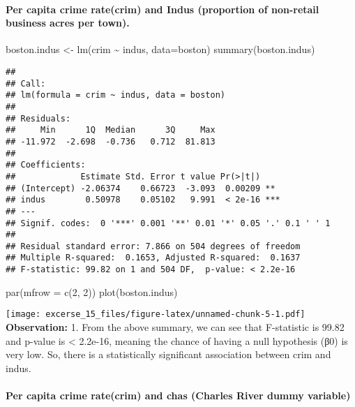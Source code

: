 \documentclass[
]{article}
\newenvironment{Shaded}{\begin{snugshade}}{\end{snugshade}}
\newcommand{\AttributeTok}[1]{\textcolor[rgb]{0.77,0.63,0.00}{#1}}
\newcommand{\DecValTok}[1]{\textcolor[rgb]{0.00,0.00,0.81}{#1}}
\newcommand{\FunctionTok}[1]{\textcolor[rgb]{0.00,0.00,0.00}{#1}}
\newcommand{\NormalTok}[1]{#1}
\newcommand{\OtherTok}[1]{\textcolor[rgb]{0.56,0.35,0.01}{#1}}
\newcommand{\SpecialCharTok}[1]{\textcolor[rgb]{0.00,0.00,0.00}{#1}}
\begin{document}
\hypertarget{per-capita-crime-ratecrim-and-indus-proportion-of-non-retail-business-acres-per-town.}{%
\paragraph{Per capita crime rate(crim) and Indus (proportion of
non-retail business acres per
town).}\label{per-capita-crime-ratecrim-and-indus-proportion-of-non-retail-business-acres-per-town.}}

\begin{Shaded}
\begin{Highlighting}[]
\NormalTok{boston.indus }\OtherTok{\textless{}{-}} \FunctionTok{lm}\NormalTok{(crim }\SpecialCharTok{\textasciitilde{}}\NormalTok{ indus, }\AttributeTok{data=}\NormalTok{boston)}
\FunctionTok{summary}\NormalTok{(boston.indus)}
\end{Highlighting}
\end{Shaded}

\begin{verbatim}
## 
## Call:
## lm(formula = crim ~ indus, data = boston)
## 
## Residuals:
##     Min      1Q  Median      3Q     Max 
## -11.972  -2.698  -0.736   0.712  81.813 
## 
## Coefficients:
##             Estimate Std. Error t value Pr(>|t|)    
## (Intercept) -2.06374    0.66723  -3.093  0.00209 ** 
## indus        0.50978    0.05102   9.991  < 2e-16 ***
## ---
## Signif. codes:  0 '***' 0.001 '**' 0.01 '*' 0.05 '.' 0.1 ' ' 1
## 
## Residual standard error: 7.866 on 504 degrees of freedom
## Multiple R-squared:  0.1653, Adjusted R-squared:  0.1637 
## F-statistic: 99.82 on 1 and 504 DF,  p-value: < 2.2e-16
\end{verbatim}

\begin{Shaded}
\begin{Highlighting}[]
\FunctionTok{par}\NormalTok{(}\AttributeTok{mfrow =} \FunctionTok{c}\NormalTok{(}\DecValTok{2}\NormalTok{, }\DecValTok{2}\NormalTok{))}
\FunctionTok{plot}\NormalTok{(boston.indus)}
\end{Highlighting}
\end{Shaded}

\texttt{[image: excerse\_15\_files/figure-latex/unnamed-chunk-5-1.pdf]}
\textbf{Observation:} 1. From the above summary, we can see that
F-statistic is 99.82 and p-value is \textless{} 2.2e-16, meaning the
chance of having a null hypothesis (β0) is very low. So, there is a
statistically significant association between crim and indus.

\hypertarget{per-capita-crime-ratecrim-and-chas-charles-river-dummy-variable}{%
\paragraph{Per capita crime rate(crim) and chas (Charles River dummy
variable)}\label{per-capita-crime-ratecrim-and-chas-charles-river-dummy-variable}}
\end{document}
